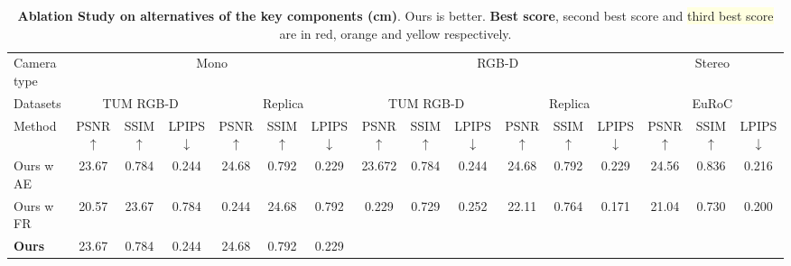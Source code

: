 \begin{table*}
\footnotesize
  \centering
   \setlength\tabcolsep{2pt} 
  \begin{tabular}{@{}l|ccc|ccc|ccc|ccc|ccc} %
    \toprule   
   Camera type & \multicolumn{6}{c|}{Mono} & \multicolumn{6}{c|}{RGB-D} & \multicolumn{3}{c}{Stereo}\\
   Datasets & \multicolumn{3}{c}{TUM RGB-D} & \multicolumn{3}{c|}{Replica} & \multicolumn{3}{c}{TUM RGB-D} & \multicolumn{3}{c|}{Replica} & \multicolumn{3}{c}{EuRoC} \\
    \midrule
   Method &  PSNR $\uparrow$ &SSIM $\uparrow$   &LPIPS $\downarrow$ &  PSNR $\uparrow$ &SSIM $\uparrow$   &LPIPS $\downarrow$ &  PSNR $\uparrow$ &SSIM $\uparrow$   &LPIPS $\downarrow$ &  PSNR $\uparrow$ &SSIM $\uparrow$   &LPIPS $\downarrow$ &  PSNR $\uparrow$ &SSIM $\uparrow$   &LPIPS $\downarrow$  \\
    \midrule          
       {Ours w AE}& 23.67 & 0.784 & 0.244 & 24.68 &	0.792 &	0.229 & 23.672 & 0.784 & 0.244 & 24.68 &	0.792 &	0.229 & 24.56 & 0.836 & 0.216 \\
       {Ours w FR} & 20.57 & 23.67 & 0.784 & 0.244 & 24.68 &	0.792 &	0.229	&0.729	&0.252 & 22.11 &	0.764	& 0.171 & 21.04	&0.730	&0.200 \\
       \midrule
       {\bf Ours}  &23.67 & 0.784 & 0.244 & 24.68 &	0.792 &	0.229  & \cellcolor{lightred}{\bf 24.53} & \cellcolor{lightred}{\bf 0.821} & \cellcolor{lightred}{\bf 0.163} & \cellcolor{lightred}{\bf 26.92} & \cellcolor{lightred}{\bf 0.863} & \cellcolor{lightred}{\bf 0.086} & \cellcolor{lightred}{\bf 26.37} & \cellcolor{lightred}{\bf 0.875} & \cellcolor{lightred}{\bf 0.112} \\
    \bottomrule
  \end{tabular}
  \caption{{\bf Ablation Study on alternatives of the key components (\rm{cm})}. Ours is better. \colorbox{lightred}{\bf Best score}, \colorbox{lightorange}{second best score} and \colorbox{lightyellow}{third best score} are in red, orange and yellow respectively.}
  \label{tab:example}
\end{table*}


